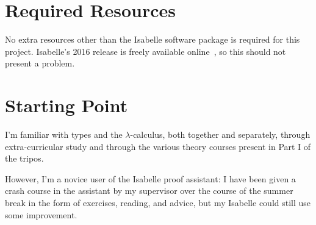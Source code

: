 \documentclass[12pt]{article}
\begin{document}
\section*{Required Resources}
No extra resources other than the Isabelle software package is required for this project.
Isabelle's 2016 release is freely available online~\parencite{isabelle-installation}, so this should not present a problem.

\section*{Starting Point}
I'm familiar with types and the \(\lambda\)-calculus, both together and separately, through extra-curricular study and through the various theory courses present in Part I of the tripos.

However, I'm a novice user of the Isabelle proof assistant: I have been given a crash course in the assistant by my supervisor over the course of the summer break in the form of exercises, reading, and advice, but my Isabelle could still use some improvement.
\end{document}
